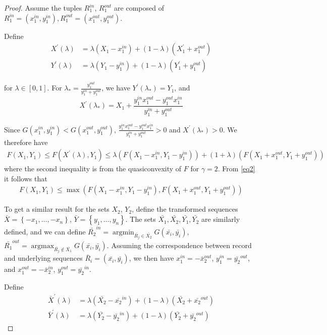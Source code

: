 \documentclass{article}
\theoremstyle{case}
\DeclareMathOperator*{\argmax}{argmax} %
\DeclareMathOperator*{\argmin}{argmin} %
\begin{document}
\begin{proof}
Assume the tuples $R_1^{in}$, $R_1^{out}$ are composed of $R_1^{in} = \left(x_1^{in}, y_1^{in}\right), R_1^{out} = \left(x_1^{out}, y_1^{out}\right)$.

Define
\begin{align*}
X^\prime\left( \lambda \right) & = \lambda \left( X_1 - x_1^{in}\right) + \left( 1 - \lambda\right) \left( X_1^\prime + x_1^{out}\right) \\
Y^\prime\left( \lambda \right) & = \lambda \left( Y_1 - y_1^{in}\right) + \left( 1 - \lambda\right) \left( Y_1^\prime + y_1^{out}\right)
\end{align*}

for $\lambda \in \left[ 0,1\right]$. For $\lambda_{*} = \frac{y_1^{out}}{y_1^{in} + y_1^{out}}$, we have $Y^\prime\left( \lambda_{*}\right) = Y_1$, and 
\[X^\prime\left( \lambda_{*}\right) = X_1 + \frac{y_1^{in}x_1^{out}-y_1^{out}x_1^{in}}{y_1^{in} + y_1^{out}}\]

Since $G(x_1^{in}, y_1^{in}) < G(x_1^{out}, y_1^{out})$, $\frac{y_1^{in}x_1^{out}-y_1^{out}x_1^{in}}{y_1^{in} + y_1^{out}} > 0$ and $X^\prime\left( \lambda_{*}\right) > 0$. We therefore have 
\begin{align} \label{eq2}
F(X_1, Y_1) \leq F(X^\prime\left( \lambda \right), Y_1) \leq \lambda\left( F(X_1-x_1^{in},Y_1-y_1^{in})\right) + \left( 1 + \lambda\right)\left( F(X_1+x_1^{out},Y_1+y_1^{out})\right)
\end{align}
where the second inequality is from the quasiconvexity of $F$ for $\gamma = 2$. From \ref{eq2} it follows that 
\begin{align} \label{eq3}
F(X_1, Y_1) \leq \max{\left(F(X_1-x_1^{in},Y_1-y_1^{in}), F(X_1+x_1^{out},Y_1+y_1^{out})\right)}
\end{align}

To get a similar result for the sets $X_2$, $Y_2$, define the transformed sequences $\bar{X} = \left\lbrace -x_1, \dots, -x_n\right\rbrace$, $\bar{Y} = \left\lbrace y_1, \dots, y_n\right\rbrace$. The sets $\bar{X_1}, \bar{X_2}, \bar{Y_1}, \bar{Y_2}$ are similarly defined, and we can define $\bar{R_2}^{in} = \argmin_{\bar{R_j} \in \bar{X_2}} G(\bar{x_i}, \bar{y_i})$, $\bar{R_1}^{out} = \argmax_{\bar{R_j} \not\in \bar{X_1}} G(\bar{x_i}, \bar{y_i})$. Assuming the correspondence between record and underlying sequences $\bar{R}_i = \left(\bar{x_i}, \bar{y_i}\right)$, we then have $x_1^{in} = -\bar{x}_2^{out}$, $y_1^{in} = \bar{y_2}^{out}$, and $x_1^{out} = -\bar{x}_2^{in}$, $y_1^{out} = \bar{y_2}^{in}$. 

Define
\begin{align*}
\bar{X}^\prime\left( \lambda \right) & = \lambda \left( \bar{X_2} - \bar{x_2}^{in}\right) + \left( 1 - \lambda\right) \left( \bar{X_2} + \bar{x_2}^{out}\right) \\
\bar{Y}^\prime\left( \lambda \right) & = \lambda \left( \bar{Y_2} - \bar{y_2}^{in}\right) + \left( 1 - \lambda\right) \left( \bar{Y_2} + \bar{y_2}^{out}\right)
\end{align*}


\end{proof}
\end{document}
